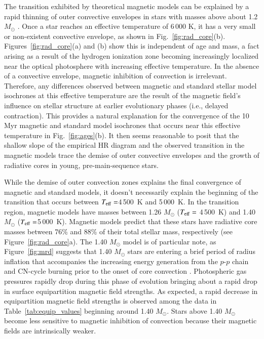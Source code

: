 \documentclass{aa}
\begin{document}
The transition exhibited by theoretical magnetic models can be explained by a rapid thinning of outer convective envelopes in stars with masses above about 1.2 $M_{\odot}$ \citep[e.g.,][]{Iben1965}. Once a star reaches an effective temperature of 6\,000 K, it has a very small or non-existent convective envelope, as shown in Fig.~\ref{fig:rad_core}(b). Figures~\ref{fig:rad_core}(a) and (b) show this is independent of age and mass, a fact arising as a result of the hydrogen ionization zone becoming increasingly localized near the optical photosphere with increasing effective temperature. In the absence of a convective envelope, magnetic inhibition of convection is irrelevant. Therefore, any differences observed between magnetic and standard stellar model isochrones at this effective temperature are the result of the magnetic field's influence on stellar structure at earlier evolutionary phases (i.e., delayed contraction). This provides a natural explanation for the convergence of the 10 Myr magnetic and standard model isochrones that occurs near this effective temperature in Fig.~\ref{fig:ages}(b). It then seems reasonable to posit that the shallow slope of the empirical HR diagram and the observed transition in the magnetic models trace the demise of outer convective envelopes and the growth of radiative cores in young, pre-main-sequence stars.

While the demise of outer convection zones explains the final convergence of magnetic and standard models, it doesn't necessarily explain the beginning of the transition that occurs between $T_{\rm eff} = $4\,500~K and 5\,000~K.  
In the transition region, magnetic models have masses between 1.26 $M_{\odot}$ ($T_{\rm eff} = $ 4\,500~K) and 1.40 $M_{\odot}$ ($T_{\rm eff} = $5\,000~K). Magnetic models predict that these stars have radiative core masses between 76\% and 88\% of their total stellar mass, respectively (see Figure~\ref{fig:rad_core}a). The 1.40 $M_{\odot}$ model is of particular note, as Figure~\ref{fig:mrd} suggests that 1.40 $M_{\odot}$ stars are entering a brief period of radius inflation that accompanies the increasing energy generation from the $p$-$p$ chain and CN-cycle burning prior to the onset of core convection \citep[e.g.,][]{Iben1965,Bodenheimer1965}. Photospheric gas pressures rapidly drop during this phase of evolution bringing about a rapid drop in surface equipartition magnetic field strengths. As expected, a rapid decrease in equipartition magnetic field strengths is observed among the data in Table~\ref{tab:equip_values} beginning around 1.40 $M_{\odot}$. Stars above 1.40 $M_{\odot}$ become less sensitive to magnetic inhibition of convection because their magnetic fields are intrinsically weaker.
\end{document}
